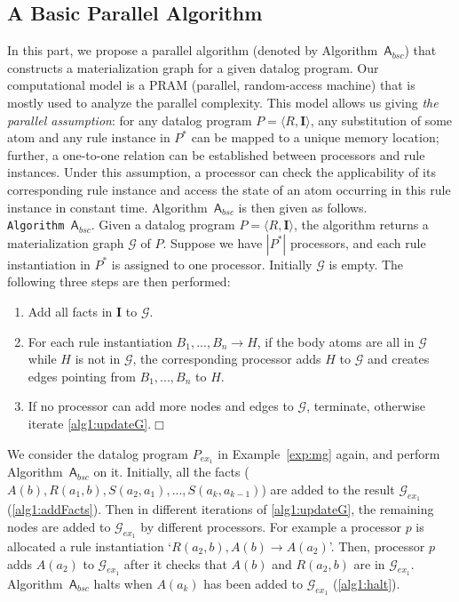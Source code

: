 \documentclass[final,1p,times]{elsarticle}
\begin{document}
\subsection{A Basic Parallel Algorithm}
\label{sec:alg-bsc}

In this part, we propose a parallel algorithm
(denoted by Algorithm~$\mathsf{A}_{bsc}$) that constructs a materialization graph for a given datalog program.
Our computational model is a PRAM (parallel, random-access machine) that is mostly used to analyze the parallel
complexity. This model allows us giving \emph{the parallel assumption}: 
for any datalog program $P=\langle R, \textbf{I}\rangle$,
any substitution of some atom and any rule instance in $P^*$ can be mapped to a unique memory
location; further, a one-to-one relation can be established between processors and rule instances.
Under this assumption, a processor can check the applicability of its corresponding
rule instance and access the state of an atom occurring in this rule instance in constant time.
Algorithm~$\mathsf{A}_{bsc}$ is then given as follows.\\


\noindent\texttt{Algorithm~$\mathsf{A}_{bsc}$}. Given a datalog program $P=\langle R, \textbf{I}\rangle$,
the algorithm returns a materialization graph $\mathcal{G}$ of $P$.
Suppose we have $|P^*|$ processors, and each rule instantiation in $P^*$ is
assigned to one processor.
Initially $\mathcal{G}$ is empty. The following three steps are then performed:
\begin{enumerate}[leftmargin=8ex,label=(\textit{Step \arabic*}),ref=Step~\arabic*]
\item Add all facts in $\textbf{I}$ to $\mathcal{G}$.\label{alg1:addFacts}
\item For each rule instantiation $B_1,...,B_n\rightarrow H$, if the body atoms are all
    in $\mathcal{G}$ while $H$ is not in $\mathcal{G}$,
    the corresponding processor adds $H$ to $\mathcal{G}$ and creates edges pointing
    from $B_1,...,B_n$ to $H$.\label{alg1:updateG}
\item If no processor can add more nodes and edges to $\mathcal{G}$, terminate, otherwise iterate \ref{alg1:updateG}.\label{alg1:halt}\hfill$\Box$
\end{enumerate}

\begin{example}
We consider the datalog program $P_{ex_1}$ in Example~\ref{exp:mg} again,
and perform Algorithm~$\mathsf{A}_{bsc}$ on it.
Initially, all the facts ($A(b),R(a_1,b),S(a_2,a_1),...,S(a_{k},a_{k-1})$) are added to the
result $\mathcal{G}_{ex_1}$ (\ref{alg1:addFacts}).
Then in different iterations of \ref{alg1:updateG}, the remaining nodes are added to
$\mathcal{G}_{ex_1}$ by different processors.
For example a processor $p$ is allocated a rule instantiation `$R(a_2,b),A(b)\rightarrow A(a_2)$'.
Then, processor $p$ adds $A(a_2)$ to $\mathcal{G}_{ex_1}$ after it checks that
$A(b)$ and $R(a_2,b)$ are in $\mathcal{G}_{ex_1}$.
Algorithm~$\mathsf{A}_{bsc}$ halts when $A(a_k)$ has been added to $\mathcal{G}_{ex_1}$ (\ref{alg1:halt}).
\end{example}
\end{document}
